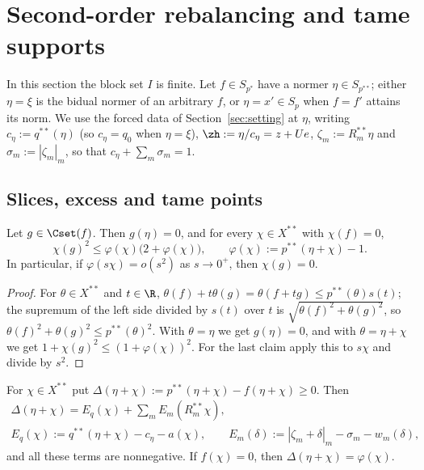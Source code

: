 \section{Second-order rebalancing and tame supports}\label{sec:second}

In this section the block set $I$ is finite.  Let $f\in S_{p^*}$ have a
normer $\eta\in S_{p^{**}}$; either $\eta=\xi$ is the bidual normer of an
arbitrary $f$, or $\eta=x'\in S_p$ when $f=f'$ attains its norm.  We use the
forced data of Section~\ref{sec:setting} at $\eta$, writing
$c_\eta:=q^{**}(\eta)$ (so $c_\eta=q_0$ when $\eta=\xi$),
$\zh:=\eta/c_\eta=z+Ue$, $\zeta_m:=R_m^{**}\eta$ and
$\sigma_m:=|\zeta_m|_m$, so that $c_\eta+\sum_m\sigma_m=1$.

\subsection{Slices, excess and tame points}

\begin{lemma}\label{lem:slice}
Let $g\in\Cset(f)$.  Then $g(\eta)=0$, and for every $\chi\in X^{**}$ with
$\chi(f)=0$,
\[
 \chi(g)^2\le\varphi(\chi)\big(2+\varphi(\chi)\big),\qquad
 \varphi(\chi):=p^{**}(\eta+\chi)-1 .
\]
In particular, if $\varphi(s\chi)=o(s^2)$ as $s\to0^+$, then $\chi(g)=0$.
\end{lemma}

\begin{proof}
For $\theta\in X^{**}$ and $t\in\R$,
$\theta(f)+t\theta(g)=\theta(f+tg)\le p^{**}(\theta)s(t)$; the supremum of the
left side divided by $s(t)$ over $t$ is $\sqrt{\theta(f)^2+\theta(g)^2}$, so
$\theta(f)^2+\theta(g)^2\le p^{**}(\theta)^2$.  With $\theta=\eta$ we get
$g(\eta)=0$, and with $\theta=\eta+\chi$ we get
$1+\chi(g)^2\le(1+\varphi(\chi))^2$.  For the last claim apply this to
$s\chi$ and divide by $s^2$.
\end{proof}

\begin{lemma}\label{lem:excess}
For $\chi\in X^{**}$ put
$\Delta(\eta+\chi):=p^{**}(\eta+\chi)-f(\eta+\chi)\ge0$.  Then
\begin{gather*}
 \Delta(\eta+\chi)=E_q(\chi)+\sum_mE_m(R_m^{**}\chi),\\
 E_q(\chi):=q^{**}(\eta+\chi)-c_\eta-a(\chi),\qquad
 E_m(\delta):=|\zeta_m+\delta|_m-\sigma_m-w_m(\delta),
\end{gather*}
and all these terms are nonnegative.  If $f(\chi)=0$, then
$\Delta(\eta+\chi)=\varphi(\chi)$.
\end{lemma}

